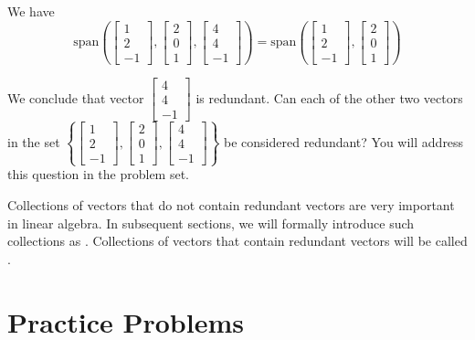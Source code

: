 \documentclass{ximera}
\begin{document}
\begin{exploration}
We have
$$\mbox{span}\left(\begin{bmatrix}1\\2\\-1\end{bmatrix},\begin{bmatrix}2\\0\\1\end{bmatrix},\begin{bmatrix}4\\4\\-1\end{bmatrix}\right)=\mbox{span}\left(\begin{bmatrix}1\\2\\-1\end{bmatrix},\begin{bmatrix}2\\0\\1\end{bmatrix}\right)$$

 We conclude that vector $\begin{bmatrix}4\\4\\-1\end{bmatrix}$ is redundant.  Can each of the other two vectors in the set 
 $\left\{\begin{bmatrix}1\\2\\-1\end{bmatrix},\begin{bmatrix}2\\0\\1\end{bmatrix},\begin{bmatrix}4\\4\\-1\end{bmatrix}\right\}$ be considered redundant?  You will address this question in the problem set. %
\end{exploration}
 
 Collections of vectors that do not contain redundant vectors are very important in linear algebra.  In subsequent sections, we will formally introduce such collections as .  Collections of vectors that contain redundant vectors will be called .  


\section*{Practice Problems}
\end{document}
